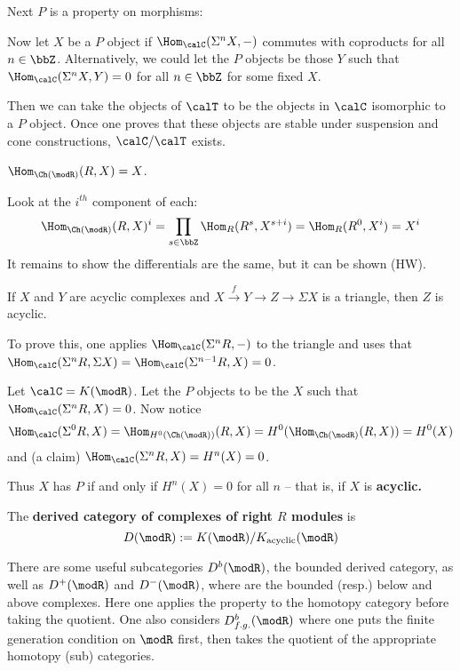 \documentclass[12pt]{article}
\begin{document}
Next $P$ is a property on morphisms:
\begin{ex}
	Now let $X$ be a $P$ object if $\Hom_{\calC}(\Sigma^nX,-)$ commutes with coproducts for all $n\in\bbZ$. Alternatively, we could 
	let the $P$ objects be those $Y$ such that $\Hom_\calC(\Sigma^nX,Y)=0$ for all $n\in\bbZ$ for some fixed $X$.

	Then we can take the objects of $\calT$ to be the objects in $\calC$ isomorphic to a $P$ object. Once one proves that these  
	objects are stable under suspension and cone constructions, $\calC/\calT$ exists.
\end{ex}
\begin{lem}
	$\Hom_{\Ch(\modR)}(R,X)=X$.
\end{lem}
\begin{prf}
	Look at the $i^{th}$ component of each:
	\[\Hom_{\Ch(\modR)}(R,X)^i=\prod_{s\in\bbZ}\Hom_R(R^s,X^{s+i})=\Hom_R(R^0,X^i)=X^i\]
	It remains to show the differentials are the same, but it can be shown (HW).
\end{prf}
\begin{lem}
	If $X$ and $Y$ are acyclic complexes and $X\xrightarrow{f}Y\to Z\to\Sigma X$ is a triangle, then $Z$ is acyclic.
\end{lem}
\begin{rmk}
	To prove this, one applies $\Hom_\calC(\Sigma^n R,-)$ to the triangle and uses that $\Hom_\calC(\Sigma^n R,\Sigma X)=\Hom_{\calC}(\Sigma^{n-1}R,X)=0$.
\end{rmk}
\begin{ex}
	Let $\calC=K(\modR)$. Let the $P$ objects to be the $X$ such that $\Hom_\calC(\Sigma^n R,X)=0$. Now notice 
	\[\Hom_\calC(\Sigma^0R,X)=\Hom_{H^0(\Ch(\modR))}(R,X)=H^0(\Hom_{\Ch(\modR)}(R,X))=H^0(X)\]
	and (a claim) $\Hom_{\calC}(\Sigma^nR,X)=H^n(X)=0$.

	Thus $X$ has $P$ if and only if $H^n(X)=0$ for all $n$ -- that is, if $X$ is \textbf{acyclic.}
\end{ex}
\begin{defn}
	The \textbf{derived category of complexes of right $R$ modules} is 
	\[D(\modR):=K(\modR)/K_{\text{acyclic}}(\modR)\]
\end{defn}
\begin{rmk}
	There are some useful subcategories $D^b(\modR)$, the bounded derived category, as well as $D^+(\modR)$ and $D^-(\modR)$,
	where are the bounded (resp.) below and above complexes. Here one applies the property to the homotopy category before taking the quotient. 
	One also considers $D_{f.g.}^b(\modR)$ where one puts the finite generation 
	condition on $\modR$ first, then takes the quotient of the appropriate homotopy (sub) categories.
\end{rmk}
\end{document}
